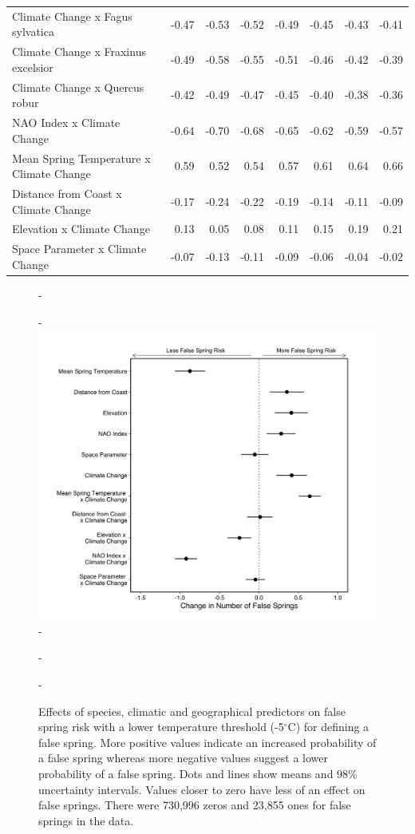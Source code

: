 \documentclass{article}\usepackage[]{graphicx}\usepackage[]{color}
\begin{document}
\begin{longtable}{lrrrrrrr}
  Climate Change
x Fagus sylvatica & -0.47 & -0.53 & -0.52 & -0.49 & -0.45 & -0.43 & -0.41 \\ 
  Climate Change
x Fraxinus excelsior & -0.49 & -0.58 & -0.55 & -0.51 & -0.46 & -0.42 & -0.39 \\ 
  Climate Change
x Quercus robur & -0.42 & -0.49 & -0.47 & -0.45 & -0.40 & -0.38 & -0.36 \\ 
  NAO Index x Climate Change & -0.64 & -0.70 & -0.68 & -0.65 & -0.62 & -0.59 & -0.57 \\ 
  Mean Spring 
Temperature x Climate Change & 0.59 & 0.52 & 0.54 & 0.57 & 0.61 & 0.64 & 0.66 \\ 
  Distance from 
Coast x Climate Change & -0.17 & -0.24 & -0.22 & -0.19 & -0.14 & -0.11 & -0.09 \\ 
  Elevation x Climate Change & 0.13 & 0.05 & 0.08 & 0.11 & 0.15 & 0.19 & 0.21 \\ 
  Space Parameter x Climate Change & -0.07 & -0.13 & -0.11 & -0.09 & -0.06 & -0.04 & -0.02 \\ 
   \hline
\hline
\end{longtable}


{\begin{figure} [H]
  -\begin{center}
  -\includegraphics[width=12cm]{..//analyses/figures/model_output_98_five.png}
  -\caption{Effects of species, climatic and geographical predictors on false spring risk with a lower temperature threshold (-5$^{\circ}$C) for defining a false spring. More positive values indicate an increased probability of a false spring whereas more negative values suggest a lower probability of a false spring. Dots and lines show means and 98\% uncertainty intervals. Values closer to zero have less of an effect on false springs. There were 730,996 zeros and 23,855 ones for false springs in the data.}\label{fig:five}
  -\end{center}
  -\end{figure}}
  
\end{document}
